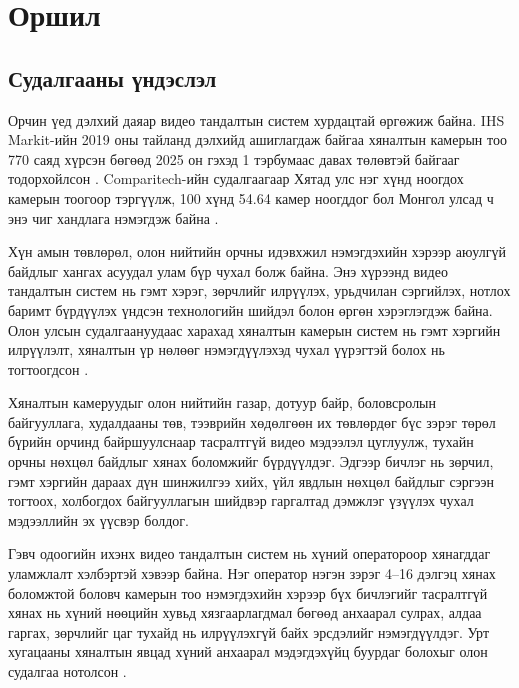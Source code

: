 
\chapter{Оршил}

\section{Судалгааны үндэслэл}

Орчин үед дэлхий даяар видео тандалтын систем хурдацтай өргөжиж байна. IHS Markit-ийн 2019 оны тайланд дэлхийд ашиглагдаж байгаа хяналтын камерын тоо 770 саяд хүрсэн бөгөөд 2025 он гэхэд 1 тэрбумаас давах төлөвтэй байгааг тодорхойлсон \cite{IHSMarkit2019}. Comparitech-ийн судалгаагаар Хятад улс нэг хүнд ноогдох камерын тоогоор тэргүүлж, 100 хүнд 54.64 камер ноогддог бол Монгол улсад ч энэ чиг хандлага нэмэгдэж байна \cite{Comparitech2020}.

Хүн амын төвлөрөл, олон нийтийн орчны идэвхжил нэмэгдэхийн хэрээр аюулгүй байдлыг хангах асуудал улам бүр чухал болж байна. Энэ хүрээнд видео тандалтын систем нь гэмт хэрэг, зөрчлийг илрүүлэх, урьдчилан сэргийлэх, нотлох баримт бүрдүүлэх үндсэн технологийн шийдэл болон өргөн хэрэглэгдэж байна. Олон улсын судалгаануудаас харахад хяналтын камерын систем нь гэмт хэргийн илрүүлэлт, хяналтын үр нөлөөг нэмэгдүүлэхэд чухал үүрэгтэй болох нь тогтоогдсон \cite{piza2019cctv}.

Хяналтын камеруудыг олон нийтийн газар, дотуур байр, боловсролын байгууллага, худалдааны төв, тээврийн хөдөлгөөн их төвлөрдөг бүс зэрэг төрөл бүрийн орчинд байршуулснаар тасралтгүй видео мэдээлэл цуглуулж, тухайн орчны нөхцөл байдлыг хянах боломжийг бүрдүүлдэг. Эдгээр бичлэг нь зөрчил, гэмт хэргийн дараах дүн шинжилгээ хийх, үйл явдлын нөхцөл байдлыг сэргээн тогтоох, холбогдох байгууллагын шийдвэр гаргалтад дэмжлэг үзүүлэх чухал мэдээллийн эх үүсвэр болдог.

Гэвч одоогийн ихэнх видео тандалтын систем нь хүний оператороор хянагддаг уламжлалт хэлбэртэй хэвээр байна. Нэг оператор нэгэн зэрэг 4--16 дэлгэц хянах боломжтой боловч камерын тоо нэмэгдэхийн хэрээр бүх бичлэгийг тасралтгүй хянах нь хүний нөөцийн хувьд хязгаарлагдмал бөгөөд анхаарал сулрах, алдаа гаргах, зөрчлийг цаг тухайд нь илрүүлэхгүй байх эрсдэлийг нэмэгдүүлдэг. Урт хугацааны хяналтын явцад хүний анхаарал мэдэгдэхүйц буурдаг болохыг олон судалгаа нотолсон \cite{mackworth1948vigilance,warm2008vigilance}.

